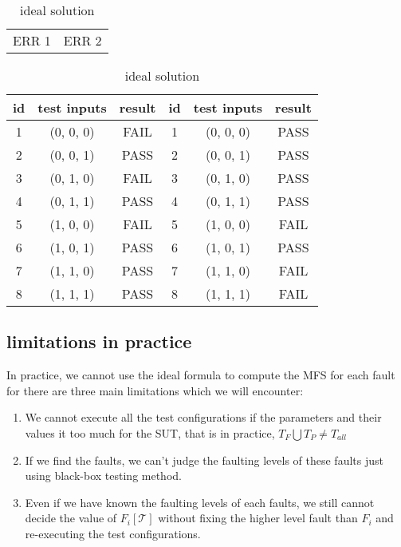 \documentclass{sig-alternate}
\begin{document}
\begin{table}
\centering
\caption{ideal solution}
\label{ideal_solution}
\begin{tabular}{p{}|p{}} \hline
   ERR 1 & ERR 2
\end{tabular}

\begin{tabular}{c|c|c|c|c|c} \hline
id &test inputs & result & id&test inputs & result\\ \hline
1 &(0, 0, 0) &  FAIL &1&(0, 0, 0) &  PASS\\ \hline
2 &(0, 0, 1) &  PASS &2&(0, 0, 1) &  PASS\\ \hline
3 &(0, 1, 0) &  FAIL &3&(0, 1, 0) &  PASS\\ \hline
4 &(0, 1, 1) &  PASS &4&(0, 1, 1) &  PASS\\ \hline
5 &(1, 0, 0) &  FAIL &5&(1, 0, 0) &  FAIL\\ \hline
6 &(1, 0, 1) &  PASS &6&(1, 0, 1) &  PASS\\ \hline
7 &(1, 1, 0) &  PASS &7&(1, 1, 0) &  FAIL\\ \hline
8 &(1, 1, 1) &  PASS &8&(1, 1, 1) &  FAIL\\ \hline
\hline\end{tabular}
\end{table}


\subsection{limitations in practice}
In practice, we cannot use the ideal formula to compute the MFS for each fault for there are three main limitations which we will encounter:

\begin{enumerate}
 \item We cannot execute all the test configurations if the parameters and their values it too much for the SUT, that is in practice, $T_{F}\bigcup T_{P} \neq T_{all}$

 \item If we find the faults, we can't judge the faulting levels of these faults just using black-box testing method.

 \item Even if we have known the faulting levels of each faults, we still cannot decide the value of $F_{i}[\mathcal{T}]$ without fixing the higher level fault than $F_{i}$ and re-executing the test configurations.
\end{enumerate}
\end{document}
